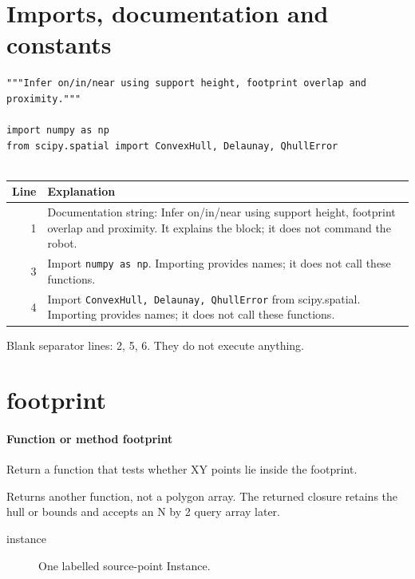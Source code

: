 \documentclass[11pt,a4paper]{book}
\begin{document}
\section{Imports, documentation and constants}

\begin{lstlisting}[firstnumber=1]
"""Infer on/in/near using support height, footprint overlap and proximity."""

import numpy as np
from scipy.spatial import ConvexHull, Delaunay, QhullError


\end{lstlisting}

\begin{longtable}{r p{}}

\textbf{Line} & \textbf{Explanation} \\ \hline \endhead

1 & Documentation string: Infer on/in/near using support height, footprint overlap and proximity. It explains the block; it does not command the robot. \\

3 & Import \texttt{numpy as np}. Importing provides names; it does not call these functions. \\

4 & Import \texttt{ConvexHull, Delaunay, QhullError} from scipy.spatial. Importing provides names; it does not call these functions. \\

\end{longtable}

Blank separator lines: 2, 5, 6. They do not execute anything.

\section{footprint}

\paragraph{Function or method footprint}
Return a function that tests whether XY points lie inside the footprint.

Returns another function, not a polygon array. The returned closure retains the hull or bounds and accepts an N by 2 query array later.

\begin{description}
\item[instance] One labelled source-point Instance.
\end{description}
\end{document}

